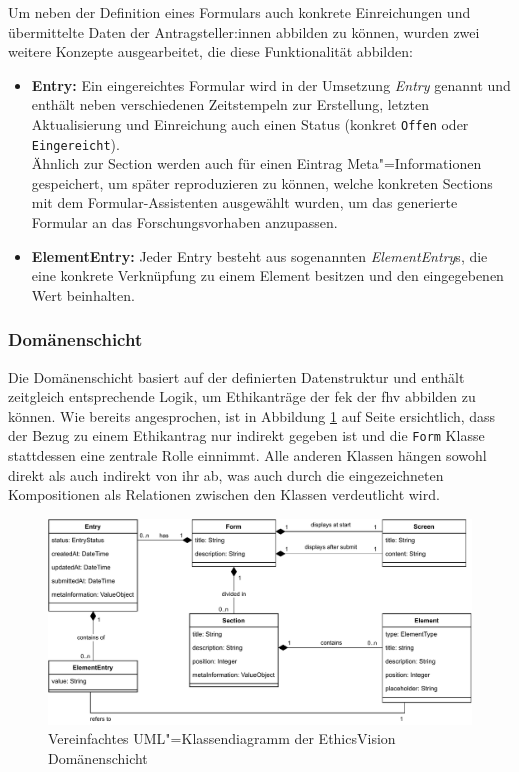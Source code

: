 \documentclass[a4paper,12pt,twoside,numbers=noendperiod]{scrreprt}
\begin{document}
Um neben der Definition eines Formulars auch konkrete Einreichungen und übermittelte Daten der Antragsteller:innen abbilden zu können, wurden zwei weitere Konzepte ausgearbeitet, die diese Funktionalität abbilden:
\begin{itemize}
    \item \textbf{Entry:} Ein eingereichtes Formular wird in der Umsetzung \textit{Entry} genannt und enthält neben verschiedenen Zeitstempeln zur Erstellung, letzten Aktualisierung und Einreichung auch einen Status (konkret \texttt{Offen} oder \texttt{Eingereicht}).\\
    Ähnlich zur Section werden auch für einen Eintrag Meta"=Informationen gespeichert, um später reproduzieren zu können, welche konkreten Sections mit dem Formular-Assistenten ausgewählt wurden, um das generierte Formular an das Forschungsvorhaben anzupassen.
    \item \textbf{ElementEntry:} Jeder Entry besteht aus sogenannten \textit{ElementEntry}s, die eine konkrete Verknüpfung zu einem Element besitzen und den eingegebenen Wert beinhalten.
\end{itemize}

\subsubsection*{Domänenschicht}
\label{sub-sub-sec:backend-domänenschicht}

Die Domänenschicht basiert auf der definierten Datenstruktur und enthält zeitgleich entsprechende Logik, um Ethikanträge der \acl{fek} der \acl{fhv} abbilden zu können. Wie bereits angesprochen, ist in Abbildung \ref{fig:ethics-vision-uml} auf Seite \pageref{fig:ethics-vision-uml} ersichtlich, dass der Bezug zu einem Ethikantrag nur indirekt gegeben ist und die \texttt{Form} Klasse stattdessen eine zentrale Rolle einnimmt. Alle anderen Klassen hängen sowohl direkt als auch indirekt von ihr ab, was auch durch die eingezeichneten Kompositionen als Relationen zwischen den Klassen verdeutlicht wird.

\begin{figure}[ht]
    \includegraphics[width=\linewidth]{thesis/images/Luidold_EthicsVision-Klassendiagramm.pdf}
    \caption{Vereinfachtes UML"=Klassendiagramm der EthicsVision Domänenschicht}
    \label{fig:ethics-vision-uml}
\end{figure}
\end{document}
